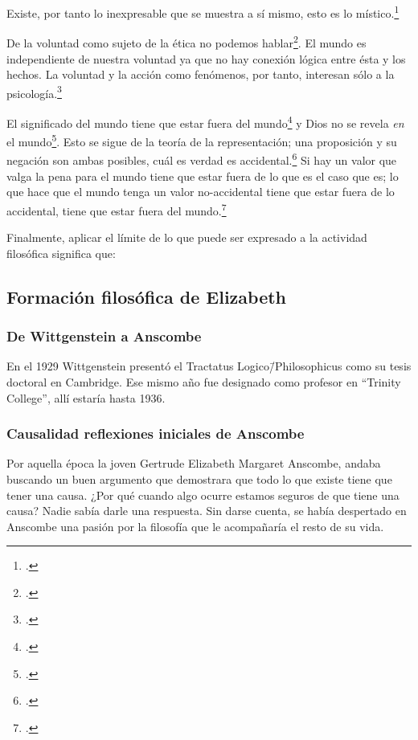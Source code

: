 Existe, por tanto lo inexpresable que se muestra a sí mismo, esto es lo
místico.\footcite[cf.~][6.522]{tractatus}

De la voluntad como sujeto de la ética no podemos
hablar\footcite[cf.~][6.423]{tractatus}. El mundo es independiente de nuestra
voluntad ya que no hay conexión lógica entre ésta y los hechos.
La voluntad y la acción como fenómenos, por tanto, interesan sólo a la
psicología.\footcite[cf.~][p.171 \S3]{IWT}

El significado del mundo tiene que estar fuera del
mundo\footcite[cf.~][6.41]{tractatus} y Dios no se revela \emph{en} el
mundo\footcite[cf.~][6.432]{tractatus}. 
Esto se sigue de la teoría de la representación; una proposición y su negación
son ambas posibles, cuál es verdad es accidental.\footcite[cf.~][p.170 \S4]{IWT}
Si hay un valor que valga la pena para el mundo tiene que estar fuera de lo que
es el caso que es; lo que hace que el mundo tenga un valor no-accidental tiene
que estar fuera de lo accidental, tiene que estar fuera del
mundo.\footcite[cf.~][6.41]{tractatus} 

Finalmente, aplicar el límite de lo que puede ser expresado a la actividad
filosófica significa que:

\subsection{Formación filosófica de Elizabeth}
\subsubsection{De Wittgenstein a Anscombe}
En el 1929 Wittgenstein presentó el Tractatus Logico\=/Philosophicus como su
tesis doctoral en Cambridge. Ese mismo año fue designado como profesor en
``Trinity College'', allí estaría hasta 1936.

\subsubsection{Causalidad reflexiones iniciales de Anscombe}
Por aquella época la joven Gertrude Elizabeth Margaret Anscombe, andaba buscando
un buen argumento que demostrara que todo lo que existe tiene que tener una
causa. ¿Por qué cuando algo ocurre estamos seguros de que tiene una causa? Nadie
sabía darle una respuesta. Sin darse cuenta, se había despertado en Anscombe
una pasión por la filosofía que le acompañaría el resto de su vida.

